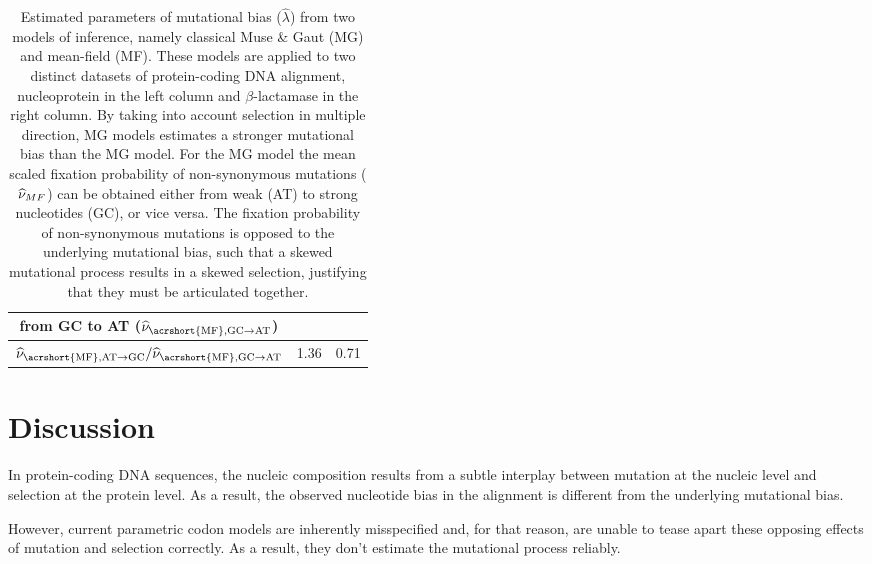 \begin{table}[htbp]
{\begin{tabu}{|c||c|c|}
        \textbf{from GC to AT ($\widehat{\avgpfix}_{\text{\acrshort{MF}},\GCtoAT}$)} & & \\
        \hline \textbf{$\widehat{\avgpfix}_{\text{\acrshort{MF}},\ATtoGC} / \widehat{\avgpfix}_{\text{\acrshort{MF}},\GCtoAT}$ } & 1.36 & 0.71 \\
        \hline
    \end{tabu}}
    \caption[Estimated parameters]{
    Estimated parameters of mutational bias ($\widehat{\lambda}$) from two models of inference, namely classical Muse \& Gaut (\acrshort{MG}) and mean-field (\acrshort{MF}).
    These models are applied to two distinct datasets of protein-coding \acrshort{DNA} alignment, nucleoprotein in the left column and $\beta$-lactamase in the right column.
    By taking into account selection in multiple direction, \acrshort{MG} models estimates a stronger mutational bias than the \acrshort{MG} model.
    For the \acrshort{MG} model the mean scaled fixation probability of \gls{non-synonymous} mutations ($\widehat{\nu}_{MF}$) can be obtained either from weak (AT) to strong nucleotides (GC), or vice versa.
    The fixation probability of \gls{non-synonymous} mutations is opposed to the underlying mutational bias, such that a skewed mutational process results in a skewed selection, justifying that they must be articulated together.
    }
    \label{tab:mut-bias-estimation}
\end{table}


\section{Discussion}\label{sec:discussion}

In protein-coding \acrshort{DNA} sequences, the nucleic composition results from a subtle interplay between mutation at the nucleic level and selection at the protein level.
As a result, the observed nucleotide bias in the alignment is different from the underlying mutational bias.

However, current parametric \gls{codon} models are inherently misspecified and, for that reason, are unable to tease apart these opposing effects of mutation and selection correctly.
As a result, they don’t estimate the mutational process reliably.

